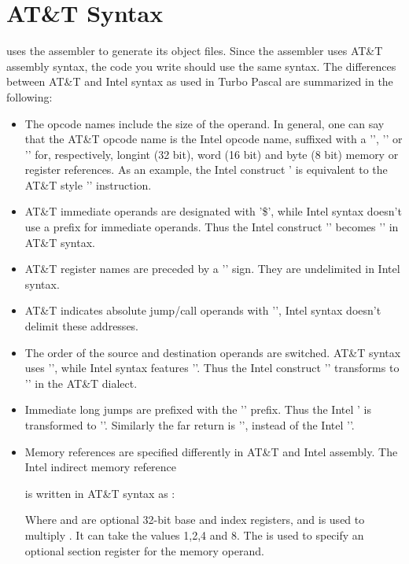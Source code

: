 \documentclass{report}
\begin{document}
\section{AT\&T Syntax}
\label{se:AttSyntax}
\fpc uses the \gnu {} assembler to generate its object files. Since
the \gnu assembler uses AT\&T assembly syntax, the code you write should
use the same syntax. The differences between AT\&T and Intel syntax as used
in Turbo Pascal are summarized in the following:
\begin{itemize}
\item The opcode names include the size of the operand. In general, one can
say that the AT\&T opcode name is the Intel opcode name, suffixed with a
'', '' or '' for, respectively, longint (32 bit), 
word (16 bit) and byte (8 bit) memory or register references. As an example,
the Intel construct \mbox{'} is equivalent to the AT\&T style '' instruction.
\item AT\&T immediate operands are designated with '\$', while Intel syntax
doesn't use a prefix for immediate operands. Thus the Intel construct
'' becomes '' in AT\&T syntax.
\item AT\&T register names are preceded by a '\var{\%}' sign. 
They are undelimited in Intel syntax. 
\item AT\&T indicates absolute jump/call operands with '\var{*}', Intel
syntax doesn't delimit these addresses.
\item The order of the source and destination operands are switched. AT\&T
syntax uses '', while Intel syntax features ''. Thus the Intel construct '' transforms to
'' in the AT\&T dialect.
\item Immediate long jumps are prefixed with the '' prefix. Thus the
Intel ' is transformed to ''. Similarly the far return is '', instead of the
Intel ''.
\item Memory references are specified differently in AT\&T and Intel
assembly. The Intel indirect memory reference
\begin{quote}
\end{quote}
is written in AT\&T syntax as :
\begin{quote}
\end{quote}
Where  and  are optional 32-bit base and index
registers, and  is used to multiply . It can take the
values 1,2,4 and 8. The  is used to specify an optional section
register for the memory operand.
\end{itemize}
\end{document}
